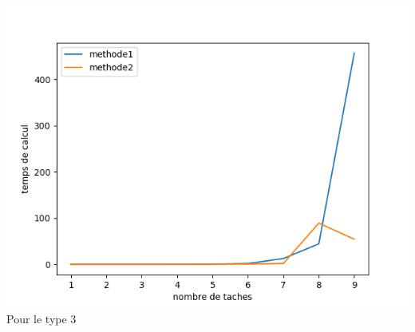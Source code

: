 \documentclass[a4paper, 10pt]{article}
\begin{document}
                \paragraph{}{
                  \includegraphics{graphes/exact_vs_mix_type3.png}
                  Pour le type 3
                }

                
                  
\end{document}
